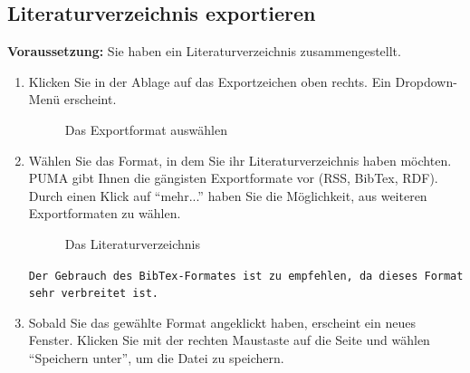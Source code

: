 \subsection{Literaturverzeichnis exportieren}
\label{subsec:lvExportieren}
\textbf{Voraussetzung:} Sie haben ein Literaturverzeichnis zusammengestellt.
\begin{enumerate}
    \item Klicken Sie in der Ablage auf das Exportzeichen oben rechts. Ein Dropdown-Menü erscheint.
\begin{figure}[h!]
 \centering
 \caption{Das Exportformat auswählen}
 \label{fig:exportformatAuswaehlen}
\end{figure}
    \item Wählen Sie das Format, in dem Sie ihr Literaturverzeichnis haben möchten. PUMA gibt Ihnen die gängisten Exportformate vor (RSS, BibTex, RDF). Durch einen Klick auf \enquote{mehr...} haben Sie die Möglichkeit, aus weiteren Exportformaten zu wählen. 
\begin{figure}[h!]
 \centering
 \caption{Das Literaturverzeichnis}
 \label{fig:literaturverzeichnis}
\end{figure}
\begin{mdframed}[style=mdfexample1,frametitle={\texttt{TIPP}},backgroundcolor=gray!40] \texttt{Der Gebrauch des BibTex-Formates ist zu empfehlen, da dieses Format sehr verbreitet ist.}
\end{mdframed}
    \item Sobald Sie das gewählte Format angeklickt haben, erscheint ein neues Fenster. Klicken Sie mit der rechten Maustaste auf die Seite und wählen \enquote{Speichern unter}, um die Datei zu speichern.
\end{enumerate}
